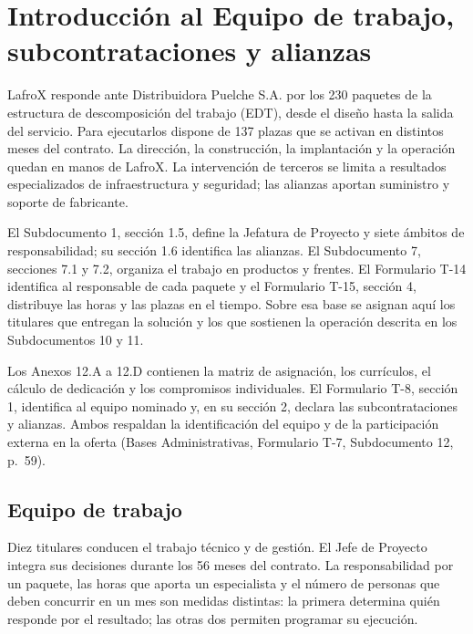 \chapter{Introducción al Equipo de trabajo, subcontrataciones y alianzas}
\label{cap:subdoc12}
\renewcommand{\arraystretch}{1.15}
\setlength{\tabcolsep}{4pt}
\renewcommand{\topfraction}{0.90}
\renewcommand{\textfraction}{0.08}

LafroX responde ante Distribuidora Puelche S.A. por los 230 paquetes de la estructura de descomposición del trabajo (EDT), desde el diseño hasta la salida del servicio. Para ejecutarlos dispone de 137 plazas que se activan en distintos meses del contrato. La dirección, la construcción, la implantación y la operación quedan en manos de LafroX. La intervención de terceros se limita a resultados especializados de infraestructura y seguridad; las alianzas aportan suministro y soporte de fabricante.

El Subdocumento 1, sección 1.5, define la Jefatura de Proyecto y siete ámbitos de responsabilidad; su sección 1.6 identifica las alianzas. El Subdocumento 7, secciones 7.1 y 7.2, organiza el trabajo en productos y frentes. El Formulario T-14 identifica al responsable de cada paquete y el Formulario T-15, sección 4, distribuye las horas y las plazas en el tiempo. Sobre esa base se asignan aquí los titulares que entregan la solución y los que sostienen la operación descrita en los Subdocumentos 10 y 11.

Los Anexos 12.A a 12.D contienen la matriz de asignación, los currículos, el cálculo de dedicación y los compromisos individuales. El Formulario T-8, sección 1, identifica al equipo nominado y, en su sección 2, declara las subcontrataciones y alianzas. Ambos respaldan la identificación del equipo y de la participación externa en la oferta (Bases Administrativas, Formulario T-7, Subdocumento 12, p.~59).

\section{Equipo de trabajo}

Diez titulares conducen el trabajo técnico y de gestión. El Jefe de Proyecto integra sus decisiones durante los 56 meses del contrato. La responsabilidad por un paquete, las horas que aporta un especialista y el número de personas que deben concurrir en un mes son medidas distintas: la primera determina quién responde por el resultado; las otras dos permiten programar su ejecución.

